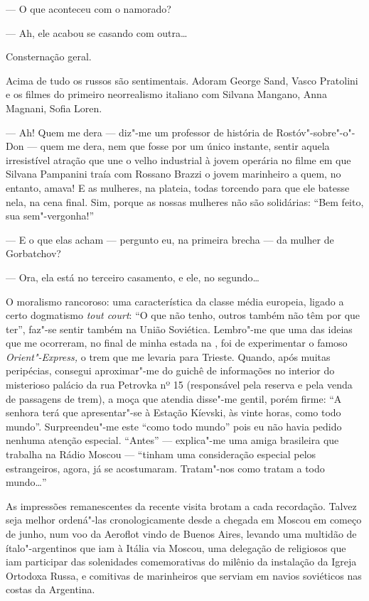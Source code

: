--- O que aconteceu com o namorado?

--- Ah, ele acabou se casando com outra\ldots{}

Consternação geral.

Acima de tudo os russos são sentimentais. Adoram George Sand, Vasco
Pratolini e os filmes do primeiro neorrealismo italiano com Silvana
Mangano, Anna Magnani, Sofia Loren.

--- Ah! Quem me dera --- diz"-me um professor de história de Rostóv"-sobre"-o"-Don --- quem me dera, nem que fosse por um único instante, sentir aquela
irresistível atração que une o velho industrial à jovem operária no
filme em que Silvana Pampanini traía com Rossano Brazzi o jovem
marinheiro a quem, no entanto, amava! E as mulheres, na plateia, todas
torcendo para que ele batesse nela, na cena final. Sim, porque as nossas
mulheres não são solidárias: ``Bem feito, sua sem"-vergonha!''

--- E o que elas acham --- pergunto eu, na primeira brecha --- da mulher de
Gorbatchov?

--- Ora, ela está no terceiro casamento, e ele, no segundo\ldots{}

O moralismo rancoroso: uma característica da classe média europeia,
ligado a certo dogmatismo \emph{tout court}: ``O que não tenho, outros
também não têm por que ter'', faz"-se sentir também na União Soviética.
Lembro"-me que uma das ideias que me ocorreram, no final de minha estada
na , foi de experimentar o famoso \emph{Orient"-Express,} o trem que
me levaria para Trieste. Quando, após muitas peripécias, consegui
aproximar"-me do guichê de informações no interior do misterioso palácio
da rua Petrovka nº 15 (responsável pela reserva e pela venda de
passagens de trem), a moça que atendia disse"-me gentil, porém firme: ``A
senhora terá que apresentar"-se à Estação Kíevski, às vinte horas, como
todo mundo''. Surpreendeu"-me este ``como todo mundo'' pois eu não havia
pedido nenhuma atenção especial. ``Antes'' --- explica"-me uma amiga
brasileira que trabalha na Rádio Moscou --- ``tinham uma consideração
especial pelos estrangeiros, agora, já se acostumaram. Tratam"-nos como
tratam a todo mundo\ldots{}''

As impressões remanescentes da recente visita brotam a cada recordação.
Talvez seja melhor ordená"-las cronologicamente desde a chegada em Moscou
em começo de junho, num voo da Aeroflot vindo de Buenos Aires, levando
uma multidão de ítalo"-argentinos que iam à Itália via Moscou, uma
delegação de religiosos que iam participar das solenidades comemorativas
do milênio da instalação da Igreja Ortodoxa Russa, e comitivas de
marinheiros que serviam em navios soviéticos nas costas da Argentina.

